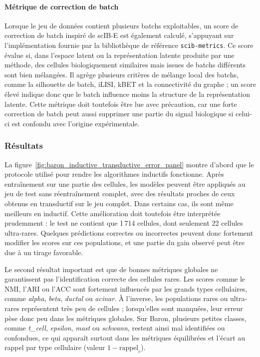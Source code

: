 \paragraph{Métrique de correction de batch}
Lorsque le jeu de données contient plusieurs batchs exploitables, un score de correction de batch inspiré de scIB-E \cite{luecken_benchmarking_2022} est également calculé, s'appuyant sur l'implémentation fournie par la bibliothèque de référence \texttt{scib-metrics}. Ce score évalue si, dans l'espace latent ou la représentation latente produite par une méthode, des cellules biologiquement similaires mais issues de batchs différents sont bien mélangées. Il agrège plusieurs critères de mélange local des batchs, comme la silhouette de batch, iLISI, kBET et la connectivité du graphe ; un score élevé indique donc que le batch influence moins la structure de la représentation latente. Cette métrique doit toutefois être lue avec précaution, car une forte correction de batch peut aussi supprimer une partie du signal biologique si celui-ci est confondu avec l'origine expérimentale.

\subsubsection{Résultats}

La figure~\ref{fig:baron_inductive_transductive_error_panel} montre d'abord que le protocole utilisé pour rendre les algorithmes inductifs fonctionne. Après entraînement sur une partie des cellules, les modèles peuvent être appliqués au jeu de test sans réentraînement complet, avec des résultats proches de ceux obtenus en transductif sur le jeu complet. Dans certains cas, ils sont même meilleurs en inductif. Cette amélioration doit toutefois être interprétée prudemment : le test ne contient que 1\,714 cellules, dont seulement 22 cellules ultra-rares. Quelques prédictions correctes ou incorrectes peuvent donc fortement modifier les scores sur ces populations, et une partie du gain observé peut être due à un tirage favorable.

Le second résultat important est que de bonnes métriques globales ne garantissent pas l'identification correcte des cellules rares. Les scores comme le NMI, l'ARI ou l'ACC sont fortement influencés par les grands types cellulaires, comme \textit{alpha}, \textit{beta}, \textit{ductal} ou \textit{acinar}. À l'inverse, les populations rares ou ultra-rares représentent très peu de cellules ; lorsqu'elles sont manquées, leur erreur pèse donc peu dans les métriques globales. Sur Baron, plusieurs petites classes, comme \textit{t\_cell}, \textit{epsilon}, \textit{mast} ou \textit{schwann}, restent ainsi mal identifiées ou confondues, ce qui apparaît surtout dans les métriques équilibrées et l'écart au rappel par type cellulaire (valeur $1 - \mathrm{rappel}_c$).

